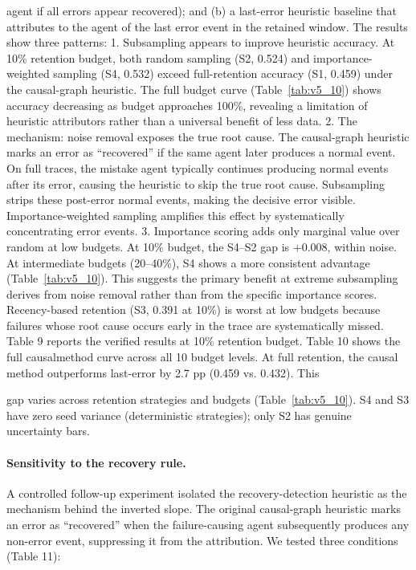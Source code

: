 \documentclass[preprint,12pt]{elsarticle}
\begin{document}
agent if all errors appear recovered); and (b) a last-error heuristic baseline that attributes to the agent of the last error event in the retained window. The results show three patterns: 1. Subsampling appears to improve heuristic accuracy. At 10\% retention budget, both random sampling (S2, 0.524) and importance-weighted sampling (S4, 0.532) exceed full-retention accuracy (S1, 0.459) under the causal-graph heuristic. The full budget curve (Table~\ref{tab:v5_10}) shows accuracy decreasing as budget approaches 100\%, revealing a limitation of heuristic attributors rather than a universal benefit of less data. 2. The mechanism: noise removal exposes the true root cause. The causal-graph heuristic marks an error as ``recovered'' if the same agent later produces a normal event. On full traces, the mistake agent typically continues producing normal events after its error, causing the heuristic to skip the true root cause. Subsampling strips these post-error normal events, making the decisive error visible. Importance-weighted sampling amplifies this effect by systematically concentrating error events. 3. Importance scoring adds only marginal value over random at low budgets. At 10\% budget, the S4--S2 gap is +0.008, within noise. At intermediate budgets (20--40\%), S4 shows a more consistent advantage (Table~\ref{tab:v5_10}). This suggests the primary benefit at extreme subsampling derives from noise removal rather than from the specific importance scores. Recency-based retention (S3, 0.391 at 10\%) is worst at low budgets because failures whose root cause occurs early in the trace are systematically missed. Table 9 reports the verified results at 10\% retention budget. Table 10 shows the full causalmethod curve across all 10 budget levels. At full retention, the causal method outperforms last-error by 2.7 pp (0.459 vs. 0.432). This


gap varies across retention strategies and budgets (Table~\ref{tab:v5_10}). S4 and S3 have zero seed variance (deterministic strategies); only S2 has genuine uncertainty bars.


\paragraph{Sensitivity to the recovery rule.} A controlled follow-up experiment isolated the recovery-detection heuristic as the mechanism behind the inverted slope. The original causal-graph heuristic marks an error as ``recovered'' when the failure-causing agent subsequently produces any non-error event, suppressing it from the attribution. We tested three conditions (Table 11):
\end{document}
